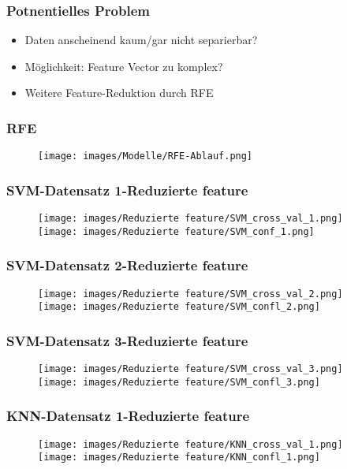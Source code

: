 \documentclass[utf8x, xcolor=dvipsnames]{beamer}
\begin{document}
\begin{frame}
\frametitle{Potnentielles Problem}
\begin{itemize}
	\item Daten anscheinend kaum/gar nicht separierbar?
	\item Möglichkeit: Feature Vector zu komplex?
	\item Weitere Feature-Reduktion durch RFE
\end{itemize}
\end{frame}

\begin{frame}
\frametitle{RFE}
\begin{figure}
	\texttt{[image: images/Modelle/RFE-Ablauf.png]}
\end{figure}
\end{frame}

\begin{frame}
\frametitle{SVM-Datensatz 1-Reduzierte feature}
\begin{figure}
	\texttt{[image: images/Reduzierte feature/SVM\_cross\_val\_1.png]}
	\texttt{[image: images/Reduzierte feature/SVM\_conf\_1.png]}
\end{figure}
\end{frame}

\begin{frame}
\frametitle{SVM-Datensatz 2-Reduzierte feature}
\begin{figure}
	\texttt{[image: images/Reduzierte feature/SVM\_cross\_val\_2.png]}
	\texttt{[image: images/Reduzierte feature/SVM\_confl\_2.png]}
\end{figure}
\end{frame}

\begin{frame}
\frametitle{SVM-Datensatz 3-Reduzierte feature}
\begin{figure}
	\texttt{[image: images/Reduzierte feature/SVM\_cross\_val\_3.png]}
	\texttt{[image: images/Reduzierte feature/SVM\_confl\_3.png]}
\end{figure}
\end{frame}

\begin{frame}
\frametitle{KNN-Datensatz 1-Reduzierte feature}
\begin{figure}
	\texttt{[image: images/Reduzierte feature/KNN\_cross\_val\_1.png]}
	\texttt{[image: images/Reduzierte feature/KNN\_confl\_1.png]}
\end{figure}
\end{frame}
\end{document}
